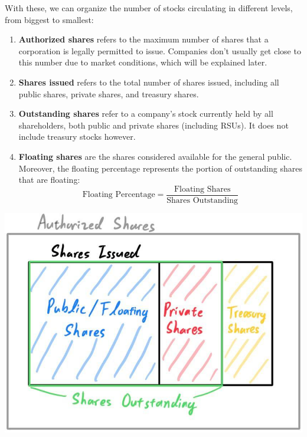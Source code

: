 \documentclass{article}
\begin{document}
    \begin{definition}
      With these, we can organize the number of stocks circulating in different levels, from biggest to smallest:
      \begin{enumerate}
        \item \textbf{Authorized shares} refers to the maximum number of shares that a corporation is legally permitted to issue. Companies don't usually get close to this number due to market conditions, which will be explained later. 
        \item \textbf{Shares issued} refers to the total number of shares issued, including all public shares, private shares, and treasury shares. 
        \item \textbf{Outstanding shares} refer to a company's stock currently held by all shareholders, both public and private shares (including RSUs). It does not include treasury stocks however. 
        \item \textbf{Floating shares} are the shares considered available for the general public. Moreover, the floating percentage represents the portion of outstanding shares that are floating: 
        \begin{equation}
          \text{Floating Percentage} = \frac{\text{Floating Shares}}{\text{Shares Outstanding}}
        \end{equation}
      \end{enumerate}
      \begin{center}
        \includegraphics[scale=0.25]{img/Shares_Outstanding.jpg}
      \end{center}
    \end{definition}
\end{document}
